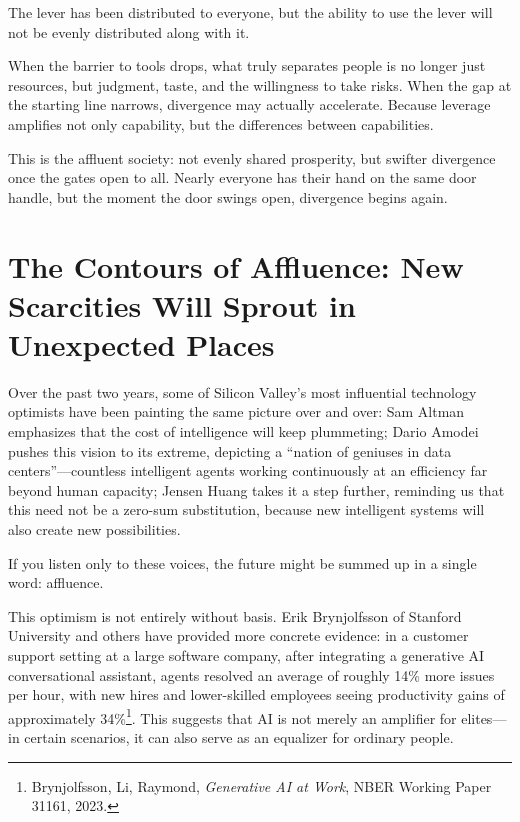\vspace{1em}

The lever has been distributed to everyone, but the ability to use the lever will not be evenly distributed along with it.

When the barrier to tools drops, what truly separates people is no longer just resources, but judgment, taste, and the willingness to take risks. When the gap at the starting line narrows, divergence may actually accelerate. Because leverage amplifies not only capability, but the differences between capabilities.

This is the affluent society: not evenly shared prosperity, but swifter divergence once the gates open to all. Nearly everyone has their hand on the same door handle, but the moment the door swings open, divergence begins again.

\section{The Contours of Affluence: New Scarcities Will Sprout in Unexpected Places}

Over the past two years, some of Silicon Valley's most influential technology optimists have been painting the same picture over and over: Sam Altman emphasizes that the cost of intelligence will keep plummeting; Dario Amodei pushes this vision to its extreme, depicting a ``nation of geniuses in data centers''---countless intelligent agents working continuously at an efficiency far beyond human capacity; Jensen Huang takes it a step further, reminding us that this need not be a zero-sum substitution, because new intelligent systems will also create new possibilities.

\vspace{1em}

If you listen only to these voices, the future might be summed up in a single word: affluence.

\vspace{1em}

This optimism is not entirely without basis. Erik Brynjolfsson of Stanford University and others have provided more concrete evidence: in a customer support setting at a large software company, after integrating a generative AI conversational assistant, agents resolved an average of roughly 14\% more issues per hour, with new hires and lower-skilled employees seeing productivity gains of approximately 34\%\footnote{Brynjolfsson, Li, Raymond, \textit{Generative AI at Work}, NBER Working Paper 31161, 2023.}. This suggests that AI is not merely an amplifier for elites---in certain scenarios, it can also serve as an equalizer for ordinary people.

